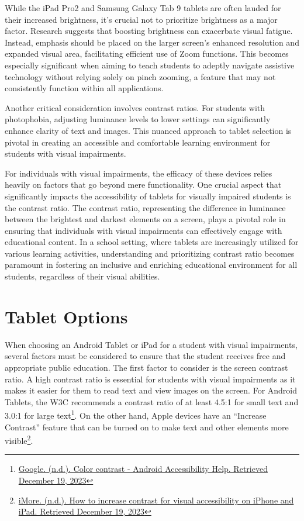 While the iPad Pro2 and Samsung Galaxy Tab 9 tablets are often lauded for their increased brightness, it's crucial not to prioritize brightness as a major factor. Research suggests that boosting brightness can exacerbate visual fatigue. Instead, emphasis should be placed on the larger screen's enhanced resolution and expanded visual area, facilitating efficient use of Zoom functions. This becomes especially significant when aiming to teach students to adeptly navigate assistive technology without relying solely on pinch zooming, a feature that may not consistently function within all applications.

Another critical consideration involves contrast ratios. For students with photophobia, adjusting luminance levels to lower settings can significantly enhance clarity of text and images. This nuanced approach to tablet selection is pivotal in creating an accessible and comfortable learning environment for students with visual impairments.

For individuals with visual impairments, the efficacy of these devices relies heavily on factors that go beyond mere functionality. One crucial aspect that significantly impacts the accessibility of tablets for visually impaired students is the contrast ratio. The contrast ratio, representing the difference in luminance between the brightest and darkest elements on a screen, plays a pivotal role in ensuring that individuals with visual impairments can effectively engage with educational content. In a school setting, where tablets are increasingly utilized for various learning activities, understanding and prioritizing contrast ratio becomes paramount in fostering an inclusive and enriching educational environment for all students, regardless of their visual abilities.


\pagebreak \hypertarget{tablet-options}{}\section{Tablet Options}\label{tab:tablet-options}
When choosing an Android Tablet or iPad for a student with visual impairments, several factors must be considered to ensure that the student receives free and appropriate public education. The first factor to consider is the screen contrast ratio. A high contrast ratio is essential for students with visual impairments as it makes it easier for them to read text and view images on the screen. For Android Tablets, the W3C recommends a contrast ratio of at least 4.5:1 for small text and 3.0:1 for large text\footnote{\raggedright \href{https://support.google.com/accessibility/android/answer/7158390?hl=en}{Google. (n.d.). Color contrast - Android Accessibility Help. Retrieved December 19, 2023}}. On the other hand, Apple devices have an “Increase Contrast” feature that can be turned on to make text and other elements more visible\footnote{\raggedright \href{https://www.imore.com/how-increase-contrast-visual-accessibility-iphone-and-ipad}{iMore. (n.d.). How to increase contrast for visual accessibility on iPhone and iPad. Retrieved December 19, 2023}}.

